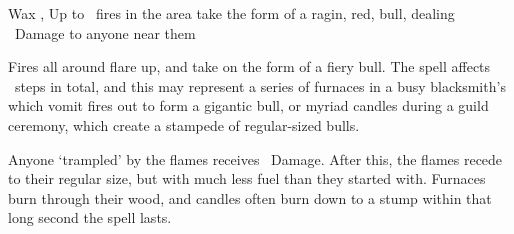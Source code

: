   {\mFire}%
  {Wax}%
  {\detailed, \duplicated}%
  {}%
  {Up to \spellArea\ fires in the area take the form of a ragin, red, bull, dealing \rollConv\ Damage to anyone near them}%
  {
    Fires all around flare up, and take on the form of a fiery bull.
    The spell affects \spellArea\ steps in total, and this may represent a series of furnaces in a busy blacksmith's which vomit fires out to form a gigantic bull, or myriad candles during a guild ceremony, which create a stampede of regular-sized bulls.

  Anyone `trampled' by the flames receives \rollConv\ Damage.
  After this, the flames recede to their regular size, but with much less fuel than they started with.
  Furnaces burn through their wood, and candles often burn down to a stump within that long second the spell lasts.
  }

